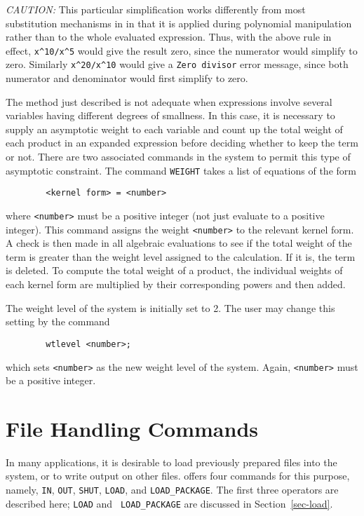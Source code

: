 {\it CAUTION:}  This particular simplification works differently from most
substitution mechanisms in {\REDUCE} in that it is applied during
polynomial manipulation rather than to the whole evaluated expression.
Thus, with the above rule in effect, {\tt x\^{ }10/x\^{ }5} would give the
result zero, since the numerator would simplify to zero.  Similarly
{\tt x\^{ }20/x\^{ }10} would give a {\tt Zero divisor} error message,
since both numerator and denominator would first simplify to zero.

The method just described is not adequate when expressions involve several
variables having different degrees of smallness. In this case, it is
necessary to supply an asymptotic weight to each variable and count up the
total weight of each product in an expanded expression before deciding
whether to keep the term or not. There are two associated commands in the
system to permit this type of asymptotic constraint. The command {\tt WEIGHT}
takes a list of equations of the form
\begin{verbatim}
        <kernel form> = <number>
\end{verbatim}
where {\tt <number>} must be a positive integer (not just evaluate to a
positive integer).  This command assigns the weight {\tt <number>} to the
relevant kernel form.  A check is then made in all algebraic evaluations
to see if the total weight of the term is greater than the weight level
assigned to the calculation.  If it is, the term is deleted.  To compute
the total weight of a product, the individual weights of each kernel form
are multiplied by their corresponding powers and then added.

The weight level of the system is initially set to 2. The user may change
this setting by the command 
\begin{verbatim}
        wtlevel <number>;
\end{verbatim}
which sets {\tt <number>} as the new weight level of the system.  Again,
{\tt <number>} must be a positive integer.

\chapter{File Handling Commands} 

In many applications, it is desirable to load previously prepared {\REDUCE}
files into the system, or to write output on other files. {\REDUCE} offers
four commands for this purpose, namely, {\tt IN}, {\tt OUT}, {\tt SHUT},
{\tt LOAD}, and {\tt LOAD\_PACKAGE}.  The first  
 three operators are described here; {\tt LOAD} and {\tt
LOAD\_PACKAGE} are discussed in Section~\ref{sec-load}.

